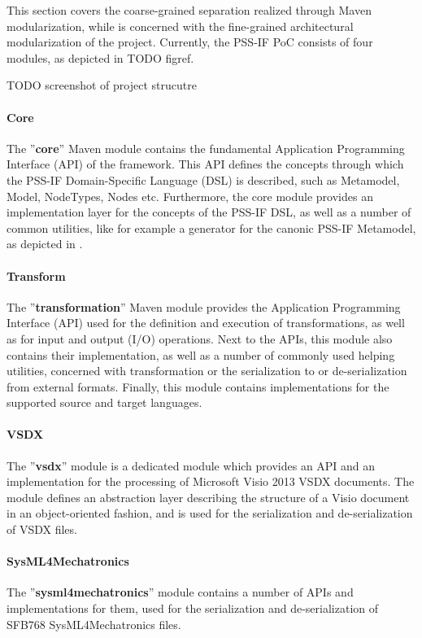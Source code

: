 This section covers the coarse-grained separation realized through Maven modularization, while  is concerned with the fine-grained architectural modularization of the project. Currently, the PSS-IF PoC consists of four modules, as depicted in \color{red} TODO figref\color{black}.

\color{red} TODO screenshot of project strucutre\color{black}

\paragraph{Core} The ''\textbf{core}'' Maven module contains the fundamental Application Programming Interface (API) of the framework. This API defines the concepts through which the PSS-IF Domain-Specific Language (DSL) is described, such as Metamodel, Model, NodeTypes, Nodes etc. Furthermore, the core module provides an implementation layer for the concepts of the PSS-IF DSL, as well as a number of common utilities, like for example a generator for the canonic PSS-IF Metamodel, as depicted in .

\paragraph{Transform} The ''\textbf{transformation}'' Maven module provides the Application Programming Interface (API) used for the definition and execution of transformations, as well as for input and output (I/O) operations. Next to the APIs, this module also contains their implementation, as well as a number of commonly used helping utilities, concerned with transformation or the serialization to or de-serialization from external formats. Finally, this module contains implementations for the supported source and target languages.

\paragraph{VSDX} The ''\textbf{vsdx}'' module is a dedicated module which provides an API and an implementation for the processing of Microsoft Visio 2013 VSDX documents. The module defines an abstraction layer describing the structure of a Visio document in an object-oriented fashion, and is used for the serialization and de-serialization of VSDX files.

\paragraph{SysML4Mechatronics} The ''\textbf{sysml4mechatronics}'' module contains a number of APIs and implementations for them, used for the serialization and de-serialization of SFB768 SysML4Mechatronics files.

